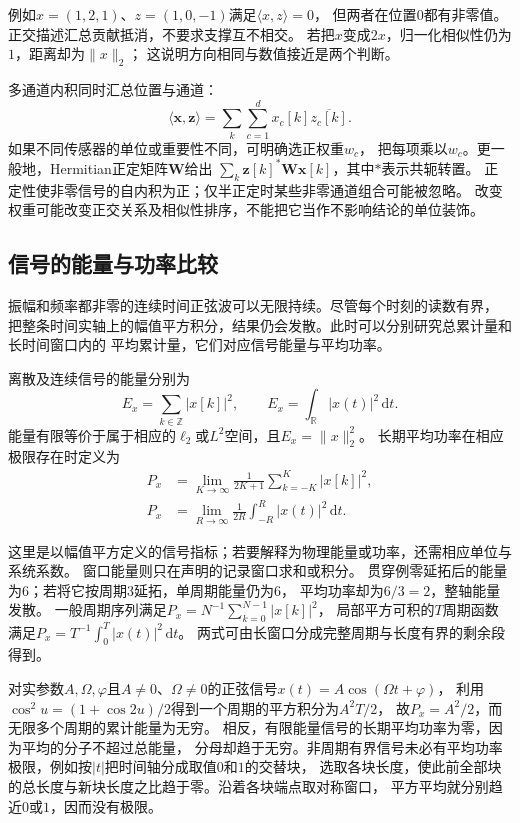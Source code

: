 例如$x=(1,2,1)$、$z=(1,0,-1)$满足$\langle x,z\rangle=0$，
但两者在位置$0$都有非零值。正交描述汇总贡献抵消，不要求支撑互不相交。
若把$x$变成$2x$，归一化相似性仍为$1$，距离却为$\|x\|_2$；
这说明方向相同与数值接近是两个判断。

多通道内积同时汇总位置与通道：
\[
  \langle\bm x,\bm z\rangle
  =\sum_k\sum_{c=1}^d x_c[k]\overline{z_c[k]}.
\]
如果不同传感器的单位或重要性不同，可明确选正权重$w_c$，
把每项乘以$w_c$。更一般地，Hermitian正定矩阵$\bm W$给出
$\sum_k\bm z[k]^*\bm W\bm x[k]$，其中$*$表示共轭转置。
正定性使非零信号的自内积为正；仅半正定时某些非零通道组合可能被忽略。
改变权重可能改变正交关系及相似性排序，不能把它当作不影响结论的单位装饰。

\subsection{信号的能量与功率比较}

振幅和频率都非零的连续时间正弦波可以无限持续。尽管每个时刻的读数有界，
把整条时间实轴上的幅值平方积分，结果仍会发散。此时可以分别研究总累计量和长时间窗口内的
平均累计量，它们对应信号能量与平均功率。
\begin{definition}[信号能量与平均功率]
  \label{def:signal-energy-power}
  离散及连续信号的能量分别为
  \[
    E_x=\sum_{k\in\mathbb Z}|x[k]|^2,\qquad
    E_x=\int_{\mathbb R}|x(t)|^2\,\mathrm dt.
  \]
  能量有限等价于属于相应的$\ell_2$或$L^2$空间，且$E_x=\|x\|_2^2$。
  长期平均功率在相应极限存在时定义为
  \begin{align*}
    P_x&=\lim_{K\to\infty}\frac1{2K+1}\sum_{k=-K}^K|x[k]|^2,\\
    P_x&=\lim_{R\to\infty}\frac1{2R}\int_{-R}^R|x(t)|^2\,\mathrm dt.
  \end{align*}
\end{definition}

这里是以幅值平方定义的信号指标；若要解释为物理能量或功率，还需相应单位与系统系数。
窗口能量则只在声明的记录窗口求和或积分。
贯穿例零延拓后的能量为$6$；若将它按周期$3$延拓，单周期能量仍为$6$，
平均功率却为$6/3=2$，整轴能量发散。
一般周期序列满足$P_x=N^{-1}\sum_{k=0}^{N-1}|x[k]|^2$，
局部平方可积的$T$周期函数满足$P_x=T^{-1}\int_0^T|x(t)|^2\,\mathrm dt$。
两式可由长窗口分成完整周期与长度有界的剩余段得到。

对实参数$A,\Omega,\varphi$且$A\neq0$、$\Omega\neq0$的正弦信号$x(t)=A\cos(\Omega t+\varphi)$，
利用$\cos^2 u=(1+\cos2u)/2$得到一个周期的平方积分为$A^2T/2$，
故$P_x=A^2/2$，而无限多个周期的累计能量为无穷。
相反，有限能量信号的长期平均功率为零，因为平均的分子不超过总能量，
分母却趋于无穷。非周期有界信号未必有平均功率极限，例如按$|t|$把时间轴分成取值$0$和$1$的交替块，
选取各块长度，使此前全部块的总长度与新块长度之比趋于零。沿着各块端点取对称窗口，
平方平均就分别趋近$0$或$1$，因而没有极限。

